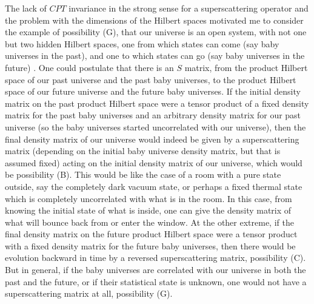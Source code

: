 \documentclass[12pt]{article}
\begin{document}
     The lack of $CPT$ invariance in the strong sense for a
superscattering
operator and the problem with the dimensions of the Hilbert spaces
motivated me
to consider the example of possibility (G), that our universe is an
open
system, with not one but two hidden Hilbert spaces, one from which
states can
come (say baby universes in the past), and one to which states can go
(say baby
universes in the future) \cite{Pag82,Pag83}. One could postulate that
there
is
an $S$ matrix, from the product Hilbert space of our past universe
and the past
baby universes, to the product Hilbert space of our future universe
and the
future baby universes.  If the initial density matrix on the past
product
Hilbert space were a tensor product of a fixed density matrix for the
past baby
universes and an arbitrary density matrix for our past universe (so
the baby
universes started uncorrelated with our universe), then the final
density
matrix of our universe would indeed be given by a superscattering
matrix
(depending on the initial baby universe density matrix, but that is
assumed
fixed) acting on the initial density matrix of our universe, which
would be
possibility (B).  This would be like the case of a room with a pure
state
outside, say the completely dark vacuum state, or perhaps a fixed
thermal state
which is completely uncorrelated with what is in the room.  In this
case, from
knowing the initial state of what is inside, one can give the density
matrix of
what will bounce back from or enter the window.  At the other
extreme, if the
final density matrix on the future product Hilbert space were a
tensor product
with a fixed density matrix for the future baby universes, then there
would be
evolution backward in time by a reversed superscattering matrix,
possibility
(C).  But in general, if the baby universes are correlated with our
universe in
both the past and the future, or if their statistical state is
unknown, one
would not have a superscattering matrix at all, possibility (G).
\end{document}
